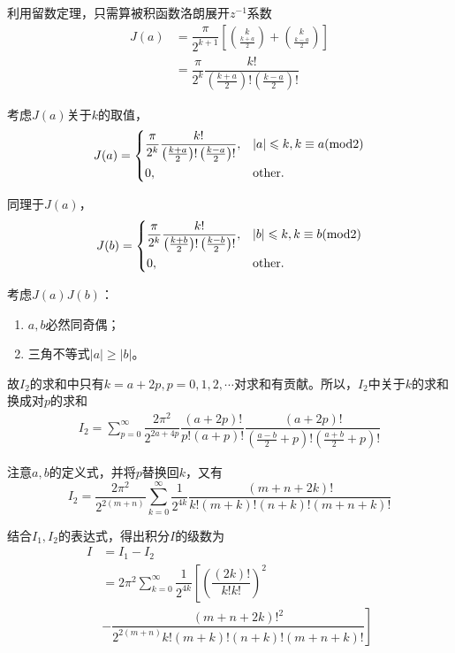 \documentclass{article} %
\begin{document}
利用留数定理，只需算被积函数洛朗展开$z^{-1}$系数
\begin{align*}
  J(a)&=\dfrac{\pi}{2^{k+1}}\left[\binom{k}{\frac{k+a}{2}}+\binom{k}{\frac{k-a}{2}}\right]\\
  &=\dfrac{\pi}{2^k}\dfrac{k!}{\left(\frac{k+a}{2}\right)!\left(\frac{k-a}{2}\right)!}
\end{align*}

考虑$J(a)$关于$k$的取值，
\begin{equation}
  J(a)=
  \begin{dcases}
    \dfrac{\pi}{2^k}\dfrac{k!}{\left(\frac{k+a}{2}\right)!\left(\frac{k-a}{2}\right)!},&|a|\leqslant k,k\equiv a(\text{mod}2)\\
    0,&\text{other}.
  \end{dcases}
\end{equation}

同理于$J(a)$，
\begin{equation}
  J(b)=
  \begin{dcases}
    \dfrac{\pi}{2^k}\dfrac{k!}{\left(\frac{k+b}{2}\right)!\left(\frac{k-b}{2}\right)!},&|b|\leqslant k,k\equiv b(\text{mod}2)\\
    0,&\text{other}.
  \end{dcases}
\end{equation}

考虑$J(a)J(b)$：
\begin{enumerate}
  \item $a,b$必然同奇偶；
  \item 三角不等式$|a|\geqslant|b|$。
\end{enumerate}
故$I_2$的求和中只有$k=a+2p,p=0,1,2,\cdots$对求和有贡献。所以，$I_2$中关于$k$的求和换成对$p$的求和
\begin{align}
  I_2=\sum_{p=0}^{\infty}\dfrac{2\pi^2}{2^{2a+4p}}\dfrac{(a+2p)!}{p!(a+p)!}\dfrac{(a+2p)!}{(\frac{a-b}{2}+p)!(\frac{a+b}{2}+p)!}
\end{align}

注意$a,b$的定义式，并将$p$替换回$k$，又有
\begin{equation}
  I_2=\dfrac{2\pi^2}{2^{2(m+n)}}\sum_{k=0}^{\infty}\dfrac{1}{2^{4k}}\dfrac{(m+n+2k)!}{k!(m+k)!(n+k)!(m+n+k)!}
\end{equation}

结合$I_1,I_2$的表达式，得出积分$I$的级数为
\begin{align*}
  I&=I_1-I_2\\
  &=2\pi^2\sum_{k=0}^{\infty}\dfrac{1}{2^{4k}}\left[\left(\dfrac{(2k)!}{k!k!}\right)^2\right.\\
  &\left.-\dfrac{(m+n+2k)!^2}{2^{2(m+n)}k!(m+k)!(n+k)!(m+n+k)!}\right]
\end{align*}
\end{document}
